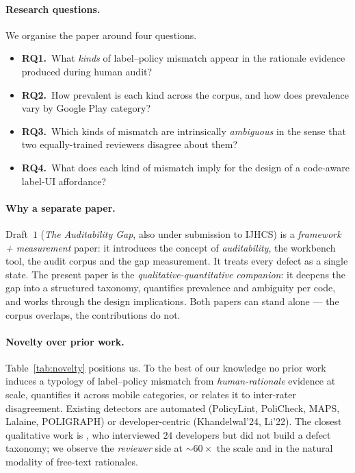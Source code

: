 \documentclass[11pt,a4paper]{article}
\begin{document}
\paragraph{Research questions.}
We organise the paper around four questions.
\begin{itemize}[topsep=2pt,itemsep=1pt,leftmargin=1.5em]
\item\textbf{RQ1.}~What \emph{kinds} of label--policy mismatch appear in
the rationale evidence produced during human audit?
\item\textbf{RQ2.}~How prevalent is each kind across the corpus, and how
does prevalence vary by Google Play category?
\item\textbf{RQ3.}~Which kinds of mismatch are intrinsically
\emph{ambiguous} in the sense that two equally-trained reviewers
disagree about them?
\item\textbf{RQ4.}~What does each kind of mismatch imply for the design
of a code-aware label-UI affordance?
\end{itemize}

\paragraph{Why a separate paper.}
Draft~$1$ (\textit{The Auditability Gap}, also under submission to
IJHCS) is a \emph{framework + measurement} paper: it introduces the
concept of \emph{auditability}, the workbench tool, the audit corpus
and the gap measurement. It treats every defect as a single state.
The present paper is the \emph{qualitative-quantitative companion}: it
deepens the gap into a structured taxonomy, quantifies prevalence and
ambiguity per code, and works through the design implications. Both
papers can stand alone --- the corpus overlaps, the contributions do
not.

\paragraph{Novelty over prior work.}
Table~\ref{tab:novelty} positions us. To the best of our knowledge no
prior work induces a typology of label--policy mismatch from
\emph{human-rationale} evidence at scale, quantifies it across mobile
categories, or relates it to inter-rater disagreement. Existing
detectors are automated (PolicyLint, PoliCheck, MAPS, Lalaine,
POLIGRAPH) or developer-centric (Khandelwal'24, Li'22). The closest
qualitative work is \citet{li2022understanding}, who interviewed $24$
developers but did not build a defect taxonomy; we observe the
\emph{reviewer} side at $\sim 60\times$ the scale and in the natural
modality of free-text rationales.
\end{document}

